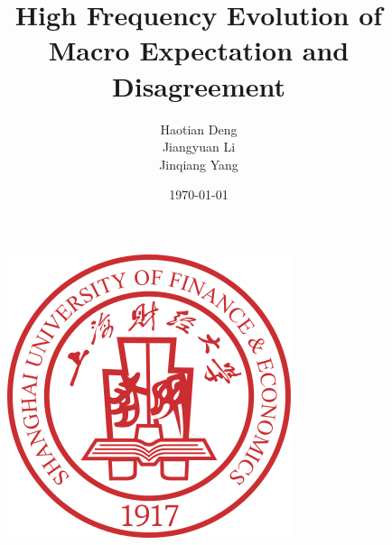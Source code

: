 \documentclass[UTF8, 10pt]{beamer}
\author[Haotian Deng] %
{
Haotian Deng
\\
Jiangyuan Li
\\
Jinqiang Yang
}
\title[High Frequency Evolution of Macro Expectation and Disagreement]{High Frequency Evolution of Macro Expectation and Disagreement}
\subtitle{}
\institute[SUFE]
{
Shanghai University of Finance and Economics
}
\date[VLC 2021]
{\today}
\begin{document}
\begin{CJK*}{UTF8}{gbsn}

\begin{frame}[noframenumbering]
	\titlepage
	\vspace{-0.5cm}
    \begin{figure}[htpb] 
        \begin{center}
            \includegraphics[width=0.19 \linewidth]{sufe_logo.png}
        \end{center}  
    \end{figure}
\end{frame}




\end{CJK*}
\end{document}

